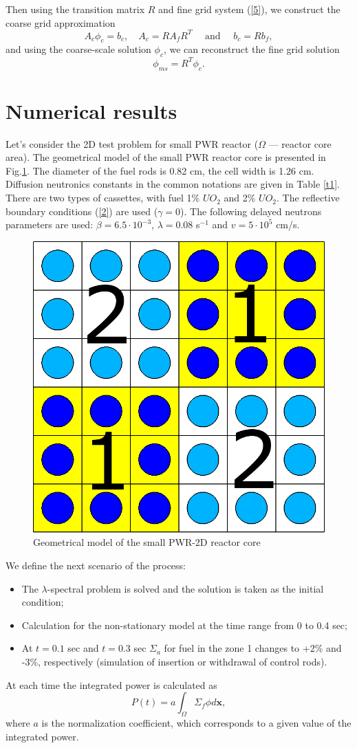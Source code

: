 \documentclass[10pt]{article}
\begin{document}
Then using the transition matrix $R$ and fine grid system (\ref{5}), we construct the coarse grid approximation
\begin{equation}\label{10}
A_c \phi_c = b_c, \quad 
A_c = R A_f R^T 
\quad \text{ and } \quad 
b_c = R b_f,
\end{equation}  
and using the coarse-scale solution $\phi_c$, we can  reconstruct the fine grid solution 
\[
\phi_{ms} = R^T \phi_c.
\]

\section{Numerical results}
Let's consider the 2D test problem for small PWR reactor \cite{smallPWR} ($\Omega$ --- reactor core area). 
The geometrical model of the small PWR reactor core is presented in Fig.\ref{p3}. 
The diameter of the fuel rods is 0.82 cm, the cell width is 1.26 cm.
Diffusion neutronics constants in the common notations are given in Table \ref{t1}. 
There are two types of cassettes, with fuel 1\% $UO_2$ and 2\% $UO_2$.
The reflective boundary conditions (\ref{2}) are used ($\gamma = 0$).
The following delayed neutrons parameters are used: $\beta = 6.5 \cdot 10^{-3}$, $\lambda = 0.08$ s$^{-1}$ and $v = 5 \cdot 10^5$ cm/s.

\begin{figure}[h]
  \begin{center}
    \includegraphics[width=0.5\linewidth] {smallpwr.png}
	\caption{Geometrical model of the small PWR-2D reactor core}
	\label{p3}
  \end{center}
\end{figure} 

We define the next scenario of the process:
\begin{itemize}
\item The $\lambda$-spectral problem is solved and the solution is taken as the initial condition;
\item Calculation for the non-stationary model at the time range from 0 to 0.4 sec;
\item At $t=0.1$ sec and $t=0.3$ sec $\Sigma_a$ for fuel in the zone 1 changes to +2\% and -3\%, respectively (simulation of insertion or withdrawal of control rods).
\end{itemize}
At each time the integrated power is calculated as
\[P(t) = a\int_{\Omega}\Sigma_f \phi d\bm x,\]
where $a$ is the normalization coefficient, which corresponds to a given value of the integrated power.
\end{document}
